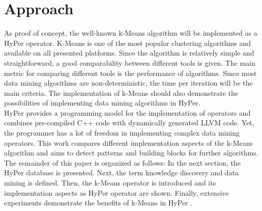 \section{Approach}
As proof of concept, the well-known k-Means algorithm will be implemented as a HyPer operator. K-Means is one of the most popular  clustering algorithms and available on all presented platforms. Since the algorithm is relatively simple and straightforward, a good comparability between different tools is given. The main metric for comparing different tools is the performance of algorithms. Since most data mining algorithms are non-deterministic, the time per iteration will be the main criteria. The implementation of k-Means should also demonstrate the possibilities of implementing data mining algorithms in HyPer.
\\
HyPer provides a programming model for the implementation of operators and combines pre-compiled C++ code with dynamically generated LLVM code. Yet, the programmer has a lot of freedom in implementing complex data mining operators. This work compares different implementation aspects of the k-Means algorithm and aims to detect patterns and building blocks for further algorithms.
\\
The remainder of this paper is organized as follows: In the next section, the HyPer database is presented. Next, the term knowledge discovery and data mining is defined. Then, the k-Means operator is introduced and its implementation aspects as HyPer operator are shown. Finally, extensive experiments demonstrate the benefits of k-Means in HyPer .




